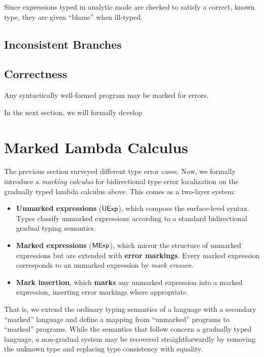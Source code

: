 


Since expressions typed in analytic mode are checked to satisfy a correct, known type, they are
given ``blame'' when ill-typed.

\subsection{Inconsistent Branches}

\subsection{Correctness}
\begin{theorem}[name=Marking Totality]
  Any syntactically well-formed program may be marked for errors.
\end{theorem}

In the next section, we will formally develop

\section{Marked Lambda Calculus}
\label{sec:calculus}

The previous section surveyed different type error cases. Now, we formally introduce a \emph{marking
calculus} for bidirectional type error localization on the gradually typed lambda calculus above.
This comes as a two-layer system:
%
\begin{itemize}
  \item \textbf{Unmarked expressions} (${\normalfont\textsf{UExp}}$), which compose the surface-level syntax. Types
    classify unmarked expressions according to a standard bidirectional gradual typing semantics.

  \item \textbf{Marked expressions} (${\normalfont\textsf{MExp}}$), which mirror the structure of unmarked expressions
    but are extended with \textbf{error markings}. Every marked expression corresponds to an
    unmarked expression by \emph{mark erasure}.

  \item \textbf{Mark insertion}, which \textbf{marks} any unmarked expression into a marked
    expression, inserting error markings where appropriate.
\end{itemize}
%
That is, we extend the ordinary typing semantics of a language with a secondary ``marked'' language
and define a mapping from ``unmarked'' programs to ``marked'' programs. While the semantics that
follow concern a gradually typed language, a non-gradual system may be recovered straightforwardly
by removing the unknown type and replacing type consistency with equality.

